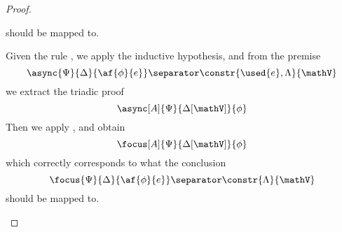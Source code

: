 \begin{proof}
\begin{itemize}
\begin{itemize}
					should be mapped to.
			\end{itemize}
		\indCase{\displaytoasy} Given the rule \derRule{\displaytoasy}, we apply the inductive hypothesis, and from the premise
			$$ \async{\Psi}{\Delta}{\af{\phi}{e}} \separator \constr{\used{e}, \Lambda}{\mathV} $$
			we extract the triadic proof
			$$ \async[A]{\Psi}{\Delta[\mathV]}{\phi} $$
			Then we apply \derRule[A]{\displaytoasy}, and obtain
			$$ \focus[A]{\Psi}{\Delta[\mathV]}{\phi} $$
			which correctly corresponds to what the conclusion 
			$$ \focus{\Psi}{\Delta}{\af{\phi}{e}} \separator \constr{\Lambda}{\mathV} $$
			should be mapped to.
	\end{itemize}
\end{proof}


